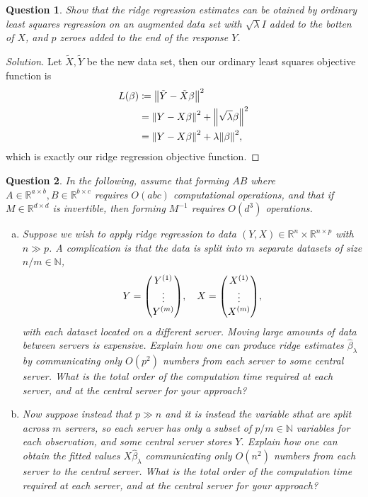 \documentclass{article}
\theoremstyle{plain}
\newtheorem{question}{Question}
\theoremstyle{remark}
\newenvironment{solution}{\begin{proof}[Solution]\renewcommand\qedsymbol{}}{\end{proof}}
\newcommand{\Bb}{\mathbb}
\newcommand{\NN}{\Bb N}
\newcommand{\RR}{\Bb R}
\newcommand\ceq\coloneqq %
\begin{document}
\begin{question}
    Show that the ridge regression estimates can be otained by ordinary least squares regression on an augmented data set with $\sqrt\lambda I$ added to the botten of $X$, and $p$ zeroes added to the end of the response $Y$. 
\end{question}

\begin{solution}
    Let $\tilde X, \tilde Y$ be the new data set, then our ordinary least squares objective function is
    \begin{align*}
    L(\beta) & \ceq \norm{\tilde Y - \tilde X \beta}^2 \\
    &= \norm{Y - X\beta}^2 + \norm{\sqrt\lambda\beta}^2 \\
    &= \norm{Y - X\beta}^2 + \lambda \norm{\beta}^2,
    \end{align*}
which is exactly our ridge regression objective function. 
\end{solution}

\begin{question}
    In the following, assume that forming $AB$ where $A \in \RR^{a \times b}, B \in \RR^{b \times c}$ requires $O(abc)$ computational operations, and that if $M \in \RR^{d \times d}$ is invertible, then forming $M^{-1}$ requires $O(d^3)$ operations. 
    \begin{enumerate}[(a)]
        \item Suppose we wish to apply ridge regression to data $(Y, X) \in \RR^n \times \RR^{n \times p}$ with $n \gg p$. A complication is that the data is split into $m$ separate datasets of size $n/m \in \NN$, 
        \[
        Y = \mqty( Y^{(1)} \\ \vdots \\ Y^{(m)}), \quad X = \mqty( X^{(1)} \\\vdots\\X^{(m)}),
        \]
        with each dataset located on a different server. Moving large amounts of data between servers is expensive. Explain how one can produce ridge estimates $\hat\beta_\lambda$ by communicating only $O(p^2)$ numbers from each server to some central server. What is the total order of the computation time required at each server, and at the central server for your approach? 
        
        \item Now suppose instead that $p \gg n$ and it is instead the variable sthat are split across $m$ servers, so each server has only a subset of $p/m \in \NN$ variables for each observation, and some central server stores $Y$. Explain how one can obtain the fitted values $X\hat\beta_\lambda$ communicating only $O(n^2)$ numbers from each server to the central server. What is the total order of the computation time required at each server, and at the central server for your approach? 
    \end{enumerate}
\end{question}
\end{document}
